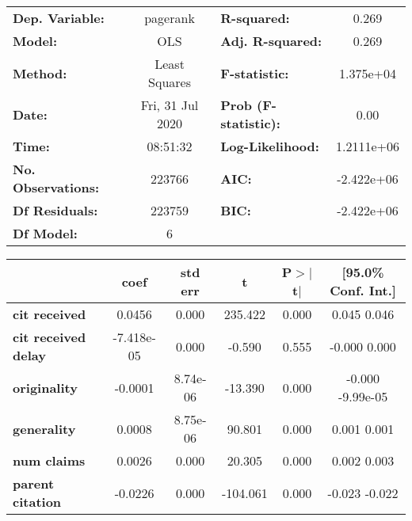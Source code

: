 \begin{center}
\begin{tabular}{lclc}
\toprule
\textbf{Dep. Variable:}     &     pagerank     & \textbf{  R-squared:         } &       0.269    \\
\textbf{Model:}             &       OLS        & \textbf{  Adj. R-squared:    } &       0.269    \\
\textbf{Method:}            &  Least Squares   & \textbf{  F-statistic:       } &   1.375e+04    \\
\textbf{Date:}              & Fri, 31 Jul 2020 & \textbf{  Prob (F-statistic):} &       0.00     \\
\textbf{Time:}              &     08:51:32     & \textbf{  Log-Likelihood:    } &   1.2111e+06   \\
\textbf{No. Observations:}  &      223766      & \textbf{  AIC:               } &   -2.422e+06   \\
\textbf{Df Residuals:}      &      223759      & \textbf{  BIC:               } &   -2.422e+06   \\
\textbf{Df Model:}          &           6      & \textbf{                     } &                \\
\bottomrule
\end{tabular}
\begin{tabular}{lccccc}
                            & \textbf{coef} & \textbf{std err} & \textbf{t} & \textbf{P$>$$|$t$|$} & \textbf{[95.0\% Conf. Int.]}  \\
\midrule
\textbf{cit received}       &       0.0456  &        0.000     &   235.422  &         0.000        &         0.045     0.046       \\
\textbf{cit received delay} &   -7.418e-05  &        0.000     &    -0.590  &         0.555        &        -0.000     0.000       \\
\textbf{originality}        &      -0.0001  &     8.74e-06     &   -13.390  &         0.000        &        -0.000 -9.99e-05       \\
\textbf{generality}         &       0.0008  &     8.75e-06     &    90.801  &         0.000        &         0.001     0.001       \\
\textbf{num claims}         &       0.0026  &        0.000     &    20.305  &         0.000        &         0.002     0.003       \\
\textbf{parent citation}    &      -0.0226  &        0.000     &  -104.061  &         0.000        &        -0.023    -0.022       \\

\end{tabular}
\end{center}
